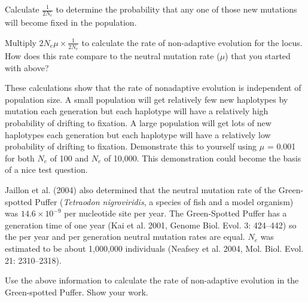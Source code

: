 \documentclass[11pt, addpoints, hidelinks]{exam}
\begin{document}
\begin{questions}
\question
Calculate $\frac{1}{2N_e}$ to determine the probability that any one of those new mutations will become fixed in the population.

\ifprintanswers{}
\else
\fi

\question
Multiply $2N_e\mu \times \frac{1}{2N_e}$ to calculate the rate of non-adaptive evolution for the locus. How does this rate compare to the neutral mutation rate ($\mu$) that you started with above?

\ifprintanswers{}	
\else
\fi

\newpage

These calculations show that the rate of nonadaptive evolution is independent of population size. A small population will get relatively few new haplotypes by mutation each generation but each haplotype will have a relatively high probability of drifting to fixation. A large population will get lots of new haplotypes each generation but each haplotype will have a relatively low probability of drifting to fixation. Demonstrate this to yourself using $\mu$ = 0.001 for both $N_e$ of 100 and $N_e$ of 10,000. This demonstration could become the basis of a nice test question.

Jaillon et al. (2004) also determined that the neutral mutation rate of the Green-spotted Puffer (\textit{Tetraodon nigroviridis}, a species of fish and a model organism) was $14.6 \times 10^{-9}$ per nucleotide site per year. The Green-Spotted Puffer has a generation time of one year (Kai et al. 2001, Genome Biol. Evol. 3: 424--442) so the per year and per generation neutral mutation rates are equal. $N_e$ was estimated to be about 1,000,000 individuals (Neafsey et al. 2004, Mol. Biol. Evol. 21: 2310--2318).

\question[4]
Use the above information to calculate the rate of non-adaptive evolution in the Green-spotted Puffer. Show your work.

\ifprintanswers{}
\end{questions}
\end{document}
